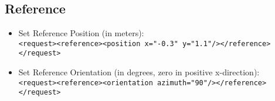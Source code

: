 \subsection{Reference}

\begin{itemize}
  \item Set Reference Position (in meters):\\
    \verb|<request><reference><position x="-0.3" y="1.1"/></reference></request>|

  \item Set Reference Orientation (in degrees, zero in positive x-direction):\\
    \verb|<request><reference><orientation azimuth="90"/></reference></request>|
\end{itemize}

%
%
%
%
%
%
%
%
